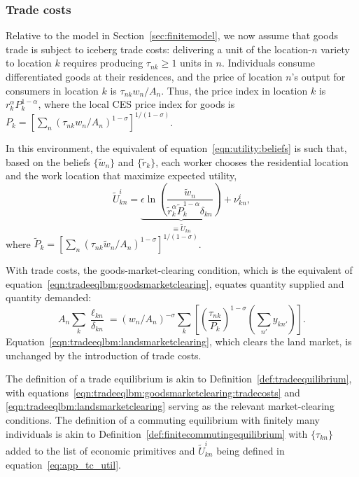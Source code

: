\documentclass[11pt]{article}
\theoremstyle{definition}
\begin{document}
\subsubsection{Trade costs}

Relative to the model in Section~\ref{sec:finitemodel},
we now assume that goods trade is subject to iceberg trade costs:
delivering a unit of the location-$n$ variety to location $k$ requires producing $\tau_{nk} \geq 1$ units in $n$.
Individuals consume differentiated goods at their residences,
and the price of location $n$'s output for consumers in location $k$ is $\tau_{nk} w_n/A_n$.
Thus,
the price index in location $k$ is
$r_k^\alpha P_k^{1-\alpha}$,
where 
the local CES price index for goods is
$P_k = \left[\sum_{n} \left(\tau_{nk} w_n/A_n\right)^{1-\sigma}\right]^{1/(1-\sigma)}$.

In this environment, the equivalent of equation~\eqref{eqn:utility:beliefs} is such that,
based on the beliefs $\{\tilde{w}_{n}\}$ and $\{\tilde{r}_{k}\}$, each worker chooses the residential location and the work location that maximize expected utility,
\begin{equation}\label{eq:app_tc_util}
	\tilde{U}_{kn}^{i} = \underbrace{\epsilon \ln\left(\frac{\tilde{w}_n}{\tilde{r}_{k}^{\alpha} \tilde{P}_k^{1-\alpha} \delta_{kn}}\right)}_{\equiv \tilde{U}_{kn}} + \nu_{kn}^i
	,
\end{equation}
where $\tilde{P}_k = \left[\sum_{n} \left(\tau_{nk} \tilde{w}_n/A_n\right)^{1-\sigma}\right]^{1/(1-\sigma)}$.

With trade costs, the goods-market-clearing condition, which is the equivalent of equation~\eqref{eqn:tradeeqlbm:goodsmarketclearing}, equates quantity supplied and quantity demanded:
\begin{equation}\label{eqn:tradeeqlbm:goodsmarketclearing:tradecosts}
	A_n \sum_k \frac{\ell_{kn}}{\delta_{kn}}
	=
	\left({w_n}/{A_n}\right)^{-\sigma} \sum_{k} \left[\left(\frac{\tau_{nk}}{P_{k}}\right)^{1-\sigma} \left(\sum_{n'} y_{kn'}\right)\right]
	.
\end{equation}
Equation~\eqref{eqn:tradeeqlbm:landsmarketclearing}, which clears the land market, is unchanged by the introduction of trade costs.

The definition of a trade equilibrium is akin to Definition~\ref{def:tradeequilibrium},
with equations~\eqref{eqn:tradeeqlbm:goodsmarketclearing:tradecosts} and \eqref{eqn:tradeeqlbm:landsmarketclearing} 
serving as the relevant market-clearing conditions.
The definition of a commuting equilibrium with finitely many individuals is akin to Definition~\ref{def:finitecommutingequilibrium} with $\{\tau_{kn}\}$ added to the list of economic primitives and $\tilde{U}_{kn}^{i}$ being defined in equation~\eqref{eq:app_tc_util}.
\end{document}
